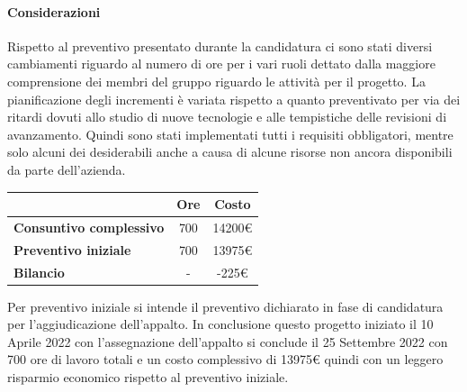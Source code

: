 \paragraph{Considerazioni} \hfill \break
Rispetto al preventivo presentato durante la candidatura ci sono stati diversi cambiamenti riguardo al numero di ore per i vari ruoli dettato dalla maggiore comprensione dei membri del gruppo riguardo le attività per il progetto. 
La pianificazione degli incrementi è variata rispetto a quanto preventivato per via dei ritardi dovuti allo studio di nuove tecnologie e alle tempistiche delle revisioni di avanzamento. 
Quindi sono stati implementati tutti i requisiti obbligatori, mentre solo alcuni dei desiderabili anche a causa di alcune risorse non ancora disponibili da parte dell'azienda.
\begin{center}
	\renewcommand{\arraystretch}{1.8}
	\begin{tabular}{ | l |c|c| }
    \hline
    & \textbf{Ore} & \textbf{Costo} \\
	\hline
    \textbf{Consuntivo complessivo} & 700 & 14200\euro \\
    \hline
    \textbf{Preventivo iniziale} & 700 & 13975\euro \\
    \hline
    \textbf{Bilancio} & - & -225\euro \\
    \hline
    \end{tabular}
\end{center}
Per preventivo iniziale si intende il preventivo dichiarato in fase di candidatura per l'aggiudicazione dell'appalto.
In conclusione questo progetto iniziato il 10 Aprile 2022 con l'assegnazione dell'appalto si conclude il 25 Settembre 2022 con 700 ore di lavoro totali e un costo complessivo di 13975€ quindi con un leggero risparmio economico rispetto al preventivo iniziale.